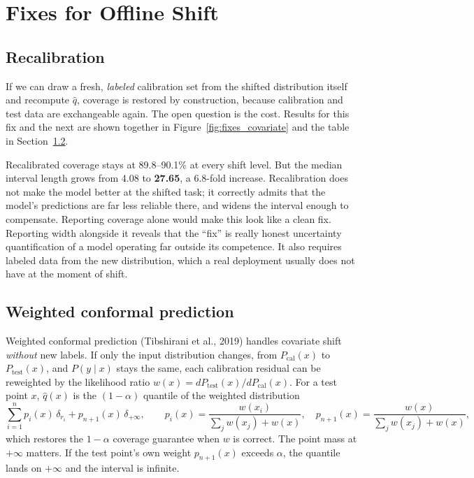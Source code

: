 \documentclass[11pt]{article}
\begin{document}
\section{Fixes for Offline Shift}
\label{sec:fixes}

\subsection{Recalibration}

If we can draw a fresh, \emph{labeled} calibration set from the shifted distribution
itself and recompute $\hat q$, coverage is restored by construction, because
calibration and test data are exchangeable again. The open question is the cost.
Results for this fix and the next are shown together in Figure~\ref{fig:fixes_covariate}
and the table in Section~\ref{sec:weighted}.

Recalibrated coverage stays at 89.8--90.1\% at every shift level. But the median
interval length grows from 4.08 to \textbf{27.65}, a 6.8-fold increase.
Recalibration does not make the model better at the shifted task; it correctly
admits that the model's predictions are far less reliable there, and widens the
interval enough to compensate. Reporting coverage alone would make this look like a
clean fix. Reporting width alongside it reveals that the ``fix'' is really honest
uncertainty quantification of a model operating far outside its competence. It also
requires labeled data from the new distribution, which a real deployment usually
does not have at the moment of shift.

\subsection{Weighted conformal prediction}
\label{sec:weighted}

Weighted conformal prediction (Tibshirani et al., 2019) handles covariate shift
\emph{without} new labels. If only the input distribution changes, from
$P_{\text{cal}}(x)$ to $P_{\text{test}}(x)$, and $P(y \mid x)$ stays the same, each
calibration residual can be reweighted by the likelihood ratio
$w(x) = dP_{\text{test}}(x)/dP_{\text{cal}}(x)$. For a test point $x$, $\hat q(x)$ is
the $(1-\alpha)$ quantile of the weighted distribution
\[
  \sum_{i=1}^n p_i(x)\, \delta_{r_i} + p_{n+1}(x)\, \delta_{+\infty},
  \qquad
  p_i(x) = \frac{w(x_i)}{\sum_{j} w(x_j) + w(x)},\quad
  p_{n+1}(x) = \frac{w(x)}{\sum_{j} w(x_j) + w(x)},
\]
which restores the $1-\alpha$ coverage guarantee when $w$ is correct. The point mass
at $+\infty$ matters. If the test point's own weight $p_{n+1}(x)$ exceeds $\alpha$,
the quantile lands on $+\infty$ and the interval is infinite.
\end{document}
